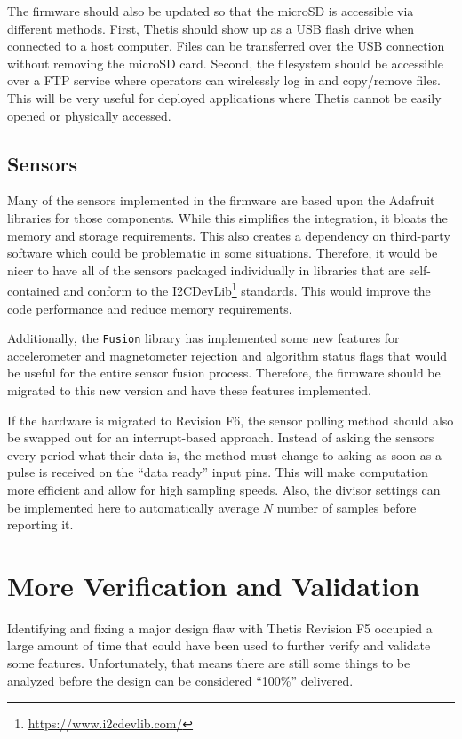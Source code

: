 The firmware should also be updated so that the microSD is accessible via different methods.
First, Thetis should show up as a USB flash drive when connected to a host computer.
Files can be transferred over the USB connection without removing the microSD card.
Second, the filesystem should be accessible over a FTP service where operators can wirelessly log in and copy/remove files.
This will be very useful for deployed applications where Thetis cannot be easily opened or physically accessed.

\subsection{Sensors} 
Many of the sensors implemented in the firmware are based upon the Adafruit libraries for those components.
While this simplifies the integration, it bloats the memory and storage requirements.
This also creates a dependency on third-party software which could be problematic in some situations.
Therefore, it would be nicer to have all of the sensors packaged individually in libraries that are self-contained and conform to the I2CDevLib\footnote{\url{https://www.i2cdevlib.com/}} standards.
This would improve the code performance and reduce memory requirements.

Additionally, the \lstinline[style=customInline]|Fusion| library has implemented some new features for accelerometer and magnetometer rejection and algorithm status flags that would be useful for the entire sensor fusion process.
Therefore, the firmware should be migrated to this new version and have these features implemented.

If the hardware is migrated to Revision F6, the sensor polling method should also be swapped out for an interrupt-based approach.
Instead of asking the sensors every period what their data is, the method must change to asking as soon as a pulse is received on the ``data ready'' input pins.
This will make computation more efficient and allow for high sampling speeds.
Also, the divisor settings can be implemented here to automatically average $N$ number of samples before reporting it.

\section{More Verification and Validation} 
Identifying and fixing a major design flaw with Thetis Revision F5 occupied a large amount of time that could have been used to further verify and validate some features.
Unfortunately, that means there are still some things to be analyzed before the design can be considered ``100\%'' delivered.

